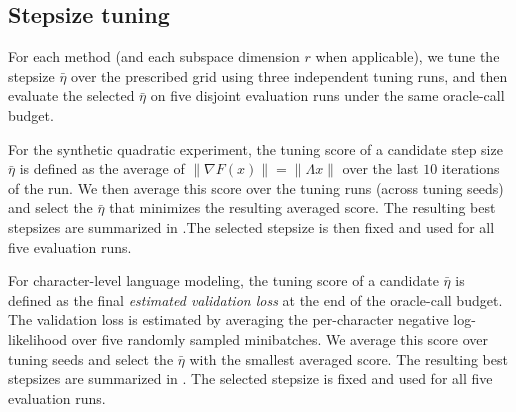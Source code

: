 \documentclass[10pt]{article}
\begin{document}
\subsection{Stepsize tuning}
For each method (and each subspace dimension $r$ when applicable), we tune the stepsize $\bar{\eta}$ over the
prescribed grid using three independent tuning runs, and then evaluate the selected $\bar{\eta}$ on five disjoint
evaluation runs under the same oracle-call budget.




For the synthetic quadratic experiment, the tuning score of a candidate step size $\bar{\eta}$ is defined as the average of
$\|\nabla F(x)\|=\|\Lambda x\|$ over the last $10$ iterations of the run.
We then average this score over the tuning runs (across tuning seeds) and select the $\bar{\eta}$ that minimizes the resulting averaged score. The resulting best stepsizes are summarized in .The selected stepsize is then fixed and used for all five evaluation runs.




For character-level language modeling, the tuning score of a candidate $\bar{\eta}$ is defined as the final
\emph{estimated validation loss} at the end of the oracle-call budget.
The validation loss is estimated by averaging the per-character negative log-likelihood over five randomly sampled minibatches.
We average this score over tuning seeds and select the $\bar{\eta}$ with the smallest averaged score. The resulting best stepsizes are summarized in .
The selected stepsize is fixed and used for all five evaluation runs.
\end{document}
